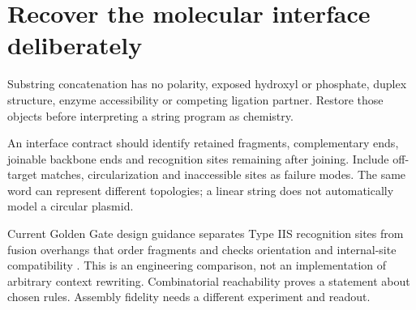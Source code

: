 \section{Recover the molecular interface deliberately}
Substring concatenation has no polarity, exposed hydroxyl or phosphate, duplex
structure, enzyme accessibility or competing ligation partner. Restore those
objects before interpreting a string program as chemistry.

An interface contract should identify retained fragments, complementary ends,
joinable backbone ends and recognition sites remaining after joining. Include
off-target matches, circularization and inaccessible sites as failure modes.
The same word can represent different topologies; a linear string does not
automatically model a circular plasmid.

Current Golden Gate design guidance separates Type IIS recognition sites
from fusion overhangs that order fragments and checks orientation and internal-site
compatibility \cite{neb}. This is an engineering comparison, not an implementation
of arbitrary context rewriting. Combinatorial reachability proves a statement
about chosen rules. Assembly fidelity needs a different experiment and readout.

